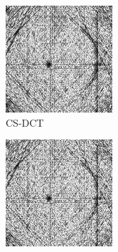 \documentclass[journal]{IEEEtran}
\begin{document}
\begin{figure}[!h]
\begin{subfigure}[b]{0.24\linewidth}
        \includegraphics[width=\textwidth]{../images/potato/post_tci/comparison/weightsIm_cs_dct30.png}
        \caption{CS-DCT}
     \end{subfigure}
    \begin{subfigure}[b]{0.24\linewidth}
        \includegraphics[width=\textwidth]{../images/potato/post_tci/comparison/weightsIm_cs_wavelet30.png}

\end{subfigure}
\end{figure}
\end{document}
